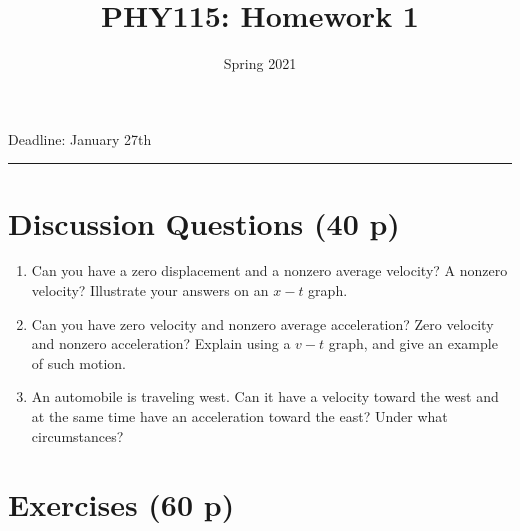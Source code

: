 \documentclass[12pt]{article}
\title{PHY115: Homework 1}
\author{Spring 2021}
\date{}
\newcommand{\blankline}{\quad\pagebreak[2]}
\begin{document}
\maketitle





\begin{center}
 Deadline: January 27th    
\end{center}
\hrule






\section*{Discussion Questions (40 p)}

\begin{enumerate}
  \item Can you have a zero displacement and a nonzero average
  velocity? A nonzero velocity? Illustrate your answers on an $x-t$ graph.
  \item Can you have zero velocity and nonzero average acceleration?
  Zero velocity and nonzero acceleration? Explain using a $v-t$
  graph, and give an example of such motion.
  \item An automobile is traveling west. Can it have a velocity
  toward the west and at the same time have an acceleration toward
  the east? Under what circumstances?
\end{enumerate}


\section*{Exercises (60 p)}
\end{document}
